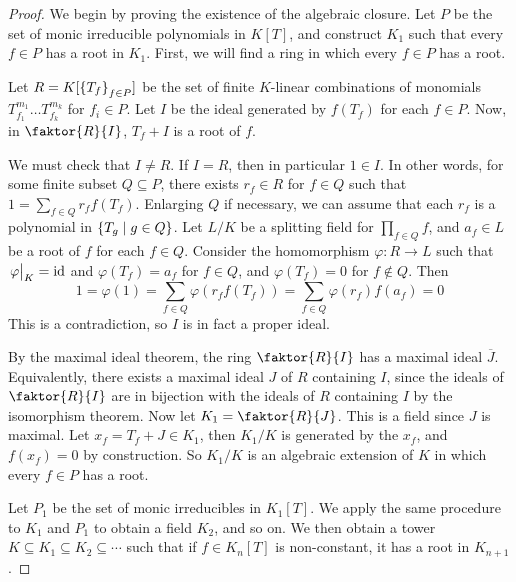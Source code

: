 \begin{proof}
	We begin by proving the existence of the algebraic closure.
	Let \( P \) be the set of monic irreducible polynomials in \( K[T] \), and construct \( K_1 \) such that every \( f \in P \) has a root in \( K_1 \).
	First, we will find a ring in which every \( f \in P \) has a root.

	Let \( R = K[\qty{T_f}_{f \in P}] \) be the set of finite \( K \)-linear combinations of monomials \( T_{f_1}^{m_1} \dots T_{f_k}^{m_k} \) for \( f_i \in P \).
	Let \( I \) be the ideal generated by \( f(T_f) \) for each \( f \in P \).
	Now, in \( \faktor{R}{I} \), \( T_f + I \) is a root of \( f \).

	We must check that \( I \neq R \).
	If \( I = R \), then in particular \( 1 \in I \).
	In other words, for some finite subset \( Q \subseteq P \), there exists \( r_f \in R \) for \( f \in Q \) such that \( 1 = \sum_{f \in Q} r_f f(T_f) \).
	Enlarging \( Q \) if necessary, we can assume that each \( r_f \) is a polynomial in \( \qty{T_g \mid g \in Q} \).
	Let \( L / K \) be a splitting field for \( \prod_{f \in Q} f \), and \( a_f \in L \) be a root of \( f \) for each \( f \in Q \).
	Consider the homomorphism \( \varphi \colon R \to L \) such that \( \eval{\varphi}_K = \mathrm{id} \) and \( \varphi(T_f) = a_f \) for \( f \in Q \), and \( \varphi(T_f) = 0 \) for \( f \not\in Q \).
	Then
	\[ 1 = \varphi(1) = \sum_{f \in Q} \varphi(r_f f(T_f)) = \sum_{f \in Q} \varphi(r_f) f(a_f) = 0 \]
	This is a contradiction, so \( I \) is in fact a proper ideal.

	By the maximal ideal theorem, the ring \( \faktor{R}{I} \) has a maximal ideal \( \overline J \).
	Equivalently, there exists a maximal ideal \( J \) of \( R \) containing \( I \), since the ideals of \( \faktor{R}{I} \) are in bijection with the ideals of \( R \) containing \( I \) by the isomorphism theorem.
	Now let \( K_1 = \faktor{R}{J} \).
	This is a field since \( J \) is maximal.
	Let \( x_f = T_f + J \in K_1 \), then \( K_1 / K \) is generated by the \( x_f \), and \( f(x_f) = 0 \) by construction.
	So \( K_1 / K \) is an algebraic extension of \( K \) in which every \( f \in P \) has a root.

	Let \( P_1 \) be the set of monic irreducibles in \( K_1[T] \).
	We apply the same procedure to \( K_1 \) and \( P_1 \) to obtain a field \( K_2 \), and so on.
	We then obtain a tower \( K \subseteq K_1 \subseteq K_2 \subseteq \cdots \) such that if \( f \in K_n[T] \) is non-constant, it has a root in \( K_{n+1} \).


\end{proof}
